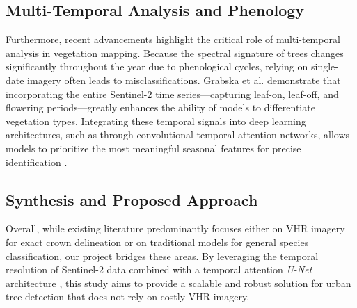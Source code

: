 \subsection{Multi-Temporal Analysis and Phenology}
Furthermore, recent advancements highlight the critical role of multi-temporal analysis in vegetation mapping. Because the spectral signature of trees changes significantly throughout the year due to phenological cycles, relying on single-date imagery often leads to misclassifications. Grabska et al. \cite{grabska2019forest} demonstrate that incorporating the entire Sentinel-2 time series—capturing leaf-on, leaf-off, and flowering periods—greatly enhances the ability of models to differentiate vegetation types. Integrating these temporal signals into deep learning architectures, such as through convolutional temporal attention networks, allows models to prioritize the most meaningful seasonal features for precise identification \cite{garnot2021panoptic, grabska2019forest}. 

\subsection{Synthesis and Proposed Approach}
Overall, while existing literature predominantly focuses either on VHR imagery for exact crown delineation or on traditional models for general species classification, our project bridges these areas. By leveraging the temporal resolution of Sentinel-2 data \cite{freudenberg2025sentinel2, grabska2019forest} combined with a temporal attention \textit{U-Net} architecture \cite{garnot2021panoptic}, this study aims to provide a scalable and robust solution for urban tree detection that does not rely on costly VHR imagery.
